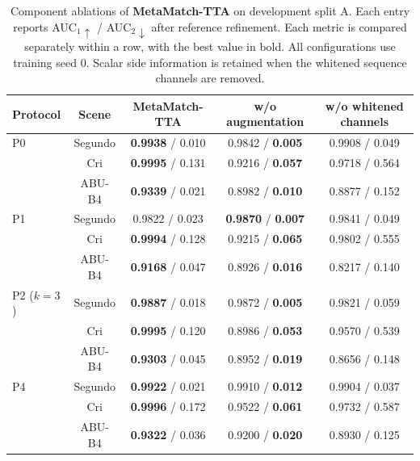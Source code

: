 \documentclass[a4paper,11pt]{article}
\renewcommand{\arraystretch}{1.18}
\newcommand{\method}{\textbf{MetaMatch-TTA}}
\begin{document}
\begin{table}[H]\centering\footnotesize\setlength{\tabcolsep}{4pt}\renewcommand{\arraystretch}{1.12}
\caption{Component ablations of \textbf{\method{}} on development split A. Each entry reports AUC$_1\uparrow$ / AUC$_2\downarrow$ after reference refinement. Each metric is compared separately within a row, with the best value in bold. All configurations use training seed 0. Scalar side information is retained when the whitened sequence channels are removed.}\label{full:tab:devab}
\begin{lrbox}{\fulltablebox}\begin{tabular}{lcccc}\toprule
Protocol & Scene & \textbf{\method{}} & w/o augmentation & w/o whitened channels \\ \midrule
P0 & Segundo & \textbf{0.9938} / 0.010 & 0.9842 / \textbf{0.005} & 0.9908 / 0.049 \\
 & Cri & \textbf{0.9995} / 0.131 & 0.9216 / \textbf{0.057} & 0.9718 / 0.564 \\
 & ABU-B4 & \textbf{0.9339} / 0.021 & 0.8982 / \textbf{0.010} & 0.8877 / 0.152 \\
P1 & Segundo & 0.9822 / 0.023 & \textbf{0.9870} / \textbf{0.007} & 0.9841 / 0.049 \\
 & Cri & \textbf{0.9994} / 0.128 & 0.9215 / \textbf{0.065} & 0.9802 / 0.555 \\
 & ABU-B4 & \textbf{0.9168} / 0.047 & 0.8926 / \textbf{0.016} & 0.8217 / 0.140 \\
P2 ($k=3$) & Segundo & \textbf{0.9887} / 0.018 & 0.9872 / \textbf{0.005} & 0.9821 / 0.059 \\
 & Cri & \textbf{0.9995} / 0.120 & 0.8986 / \textbf{0.053} & 0.9570 / 0.539 \\
 & ABU-B4 & \textbf{0.9303} / 0.045 & 0.8952 / \textbf{0.019} & 0.8656 / 0.148 \\
P4 & Segundo & \textbf{0.9922} / 0.021 & 0.9910 / \textbf{0.012} & 0.9904 / 0.037 \\
 & Cri & \textbf{0.9996} / 0.172 & 0.9522 / \textbf{0.061} & 0.9732 / 0.587 \\
 & ABU-B4 & \textbf{0.9322} / 0.036 & 0.9200 / \textbf{0.020} & 0.8930 / 0.125 \\
\bottomrule\end{tabular}\end{lrbox}\ifdim\wd\fulltablebox>\linewidth\resizebox{\linewidth}{!}{\usebox{\fulltablebox}}\else\usebox{\fulltablebox}\fi\end{table}
\end{document}

